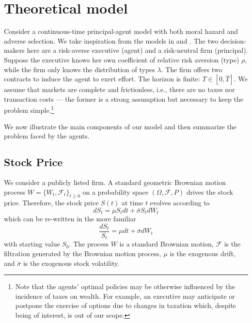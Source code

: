 \section{Theoretical model}

Consider a continuous-time principal-agent model with both moral hazard and adverse selection. We take inspiration from the models in \citet{sannikov2008continuous} and \citet{cadenillas2002executive}. The two decision-makers here are a risk-averse executive (agent) and a risk-neutral firm (principal). Suppose the executive knows her own coefficient of relative risk aversion (type) $\rho$, while the firm only knows the distribution of types $\lambda$. The firm offers two contracts to induce the agent to exert effort. The horizon is finite: $T \in [0, \bar{T}]$. We assume that markets are complete and frictionless, i.e., there are no taxes nor transaction costs --- the former is a strong assumption but necessary to keep the problem simple.\footnote{Note that the agents' optimal policies may be otherwise influenced by the incidence of taxes on wealth. For example, an executive may anticipate or postpone the exercise of options due to changes in taxation which, despite being of interest, is out of our scope.}

We now illustrate the main components of our model and then summarize the problem faced by the agents.

\subsection{Stock Price}
We consider a publicly listed firm. A standard geometric Brownian motion process $W = \{ W_t, \mathscr{F}_t \}_{t \ge 0}$ on a probability space $(\Omega, \mathscr{F}, P)$ drives the stock price. 
Therefore, the stock price $S(t)$ at time $t$ evolves according to 
$$ dS_t = \mu S_t dt + \bar{\sigma} S_t dW_t $$
which can be re-written in the more familiar
$$ \frac{dS_t}{S_t} = \mu dt + \bar{\sigma} dW_t $$
with starting value $S_0$. The process $W$ is a standard Brownian motion, $\mathscr{F}$ is the filtration generated by the Brownian motion process, $\mu$ is the exogenous drift, and $\bar{\sigma}$ is the exogenous stock volatility. 

